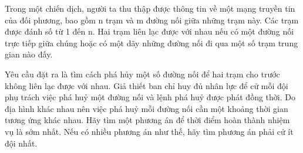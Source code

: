 Trong một chiến dịch, người ta thu thập được thông tin về một mạng truyền tin của đối phương, bao gồm n trạm và m đường nối giữa những trạm   này. Các trạm được đánh số từ 1 đến n. Hai trạm liên lạc được với nhau nếu có một đường nối trực tiếp giữa chúng hoặc có một dãy những đường nối   đi qua một số trạm trung gian nào đấy.  

   Yêu cầu đặt ra là tìm cách phá hủy một số đường nối để hai trạm cho trước không liên lạc được với nhau. Giả thiết ban chỉ huy đủ nhân lực để cử   mỗi đội phụ trách việc phá huỷ một đường nối và lệnh phá huỷ được phát đồng thời. Do địa hình khác nhau nên việc phá huỷ mỗi đường nối cần một   khoảng thời gian tương ứng khác nhau. Hãy tìm một phương án để thời điểm hoàn thành nhiệm vụ là sớm nhất. Nếu có nhiều phương án như thế, hãy tìm   phương án phải cử ít đội nhất.  

\